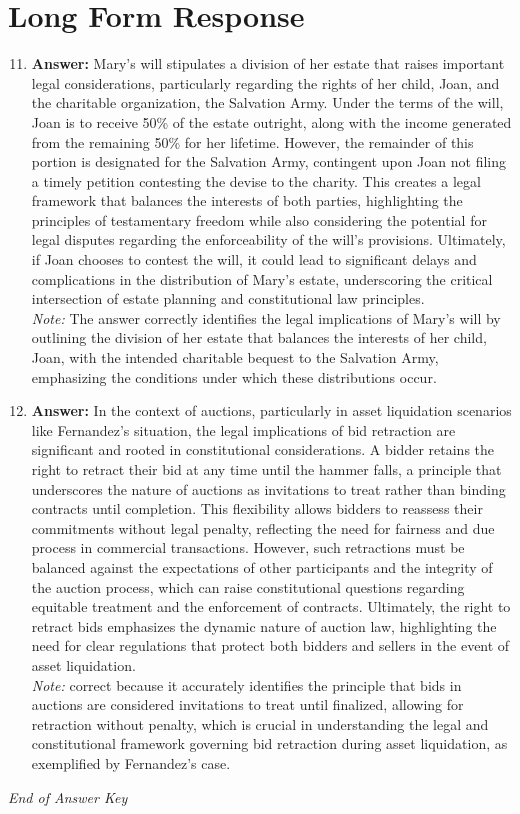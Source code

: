 \documentclass[12pt]{article}
\begin{document}
\section*{Long Form Response}
\begin{enumerate}[label=\arabic*.]
\setcounter{enumi}{10}
\item \textbf{Answer:} Mary's will stipulates a division of her estate that raises important legal considerations, particularly regarding the rights of her child, Joan, and the charitable organization, the Salvation Army. Under the terms of the will, Joan is to receive 50\% of the estate outright, along with the income generated from the remaining 50\% for her lifetime. However, the remainder of this portion is designated for the Salvation Army, contingent upon Joan not filing a timely petition contesting the devise to the charity. This creates a legal framework that balances the interests of both parties, highlighting the principles of testamentary freedom while also considering the potential for legal disputes regarding the enforceability of the will's provisions. Ultimately, if Joan chooses to contest the will, it could lead to significant delays and complications in the distribution of Mary's estate, underscoring the critical intersection of estate planning and constitutional law principles.
\\ \textit{Note:} The answer correctly identifies the legal implications of Mary's will by outlining the division of her estate that balances the interests of her child, Joan, with the intended charitable bequest to the Salvation Army, emphasizing the conditions under which these distributions occur.
\item \textbf{Answer:} In the context of auctions, particularly in asset liquidation scenarios like Fernandez's situation, the legal implications of bid retraction are significant and rooted in constitutional considerations. A bidder retains the right to retract their bid at any time until the hammer falls, a principle that underscores the nature of auctions as invitations to treat rather than binding contracts until completion. This flexibility allows bidders to reassess their commitments without legal penalty, reflecting the need for fairness and due process in commercial transactions. However, such retractions must be balanced against the expectations of other participants and the integrity of the auction process, which can raise constitutional questions regarding equitable treatment and the enforcement of contracts. Ultimately, the right to retract bids emphasizes the dynamic nature of auction law, highlighting the need for clear regulations that protect both bidders and sellers in the event of asset liquidation.
\\ \textit{Note:} correct because it accurately identifies the principle that bids in auctions are considered invitations to treat until finalized, allowing for retraction without penalty, which is crucial in understanding the legal and constitutional framework governing bid retraction during asset liquidation, as exemplified by Fernandez's case.
\end{enumerate}

\vfill
\noindent\textit{End of Answer Key}
\end{document}
